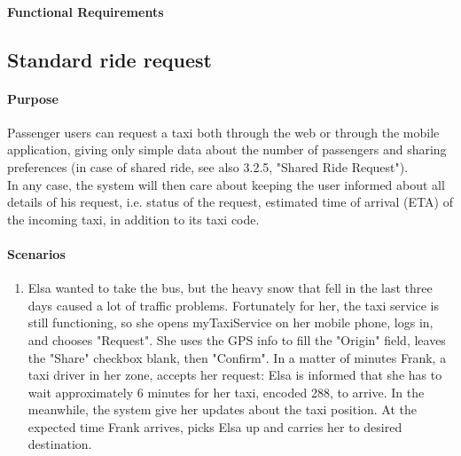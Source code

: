 \paragraph{Functional Requirements}

\subsection{Standard ride request}
\paragraph{Purpose}
Passenger users can request a taxi both through the web or through the mobile application, giving only simple data about the number of passengers and sharing preferences (in case of shared ride, see also 3.2.5, "Shared Ride Request").\\
In any case, the system will then care about keeping the user informed about all details of his request, i.e. status of the request, estimated time of arrival (ETA) of the incoming taxi, in addition to its taxi code.
\paragraph{Scenarios}
\begin{enumerate}
	\item Elsa wanted to take the bus, but the heavy snow that fell in the last three days caused a lot of traffic problems. Fortunately for her, the taxi service is still functioning, so she opens myTaxiService on her mobile phone, logs in, and chooses "Request".
	She uses the GPS info to fill the "Origin" field, leaves the "Share" checkbox blank, then "Confirm". In a matter of minutes Frank, a taxi driver in her zone, accepts her request: Elsa is informed that she has to wait approximately 6 minutes for her taxi, encoded 288, to arrive. In the meanwhile, the system give her updates about the taxi position. At the expected time Frank arrives, picks Elsa up and carries her to desired destination.
\end{enumerate}
